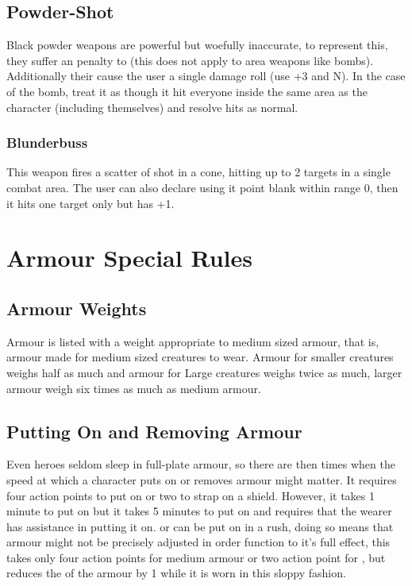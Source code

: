 \subsection{Powder-Shot}
Black powder weapons are powerful but woefully inaccurate, to represent this, they suffer an  penalty to  (this does not apply to area weapons like bombs). Additionally their  cause the user a single damage roll (use  +3 and  N). In the case of the bomb, treat it as though it hit everyone inside the same area as the character (including themselves) and resolve hits as normal.

\subsubsection{Blunderbuss}
This weapon fires a scatter of shot in a cone, hitting up to 2 targets in a single combat area. The user can also declare using it point blank within range 0, then it hits one target only but has  +1.





\section{Armour Special Rules}
\label{sec:armspec}

\subsection{Armour Weights}
Armour is listed with a weight appropriate to medium sized armour, that is, armour made for medium sized creatures to wear. Armour for smaller creatures weighs half as much and armour for Large creatures weighs twice as much, larger armour weigh six times as much as medium armour.


\subsection{Putting On and Removing Armour}
Even heroes seldom sleep in full-plate armour, so there are then times when the speed at which a character puts on or removes armour might matter. It requires four action points to put on  or two to strap on a shield. However, it takes 1 minute to put on  but it takes 5 minutes to put on  and requires that the wearer has assistance in putting it on.  or  can be put on in a rush, doing so means that armour might not be precisely adjusted in order function to it's full effect, this takes only four action points for medium armour or two action point for , but reduces the  of the armour by 1 while it is worn in this sloppy fashion.

